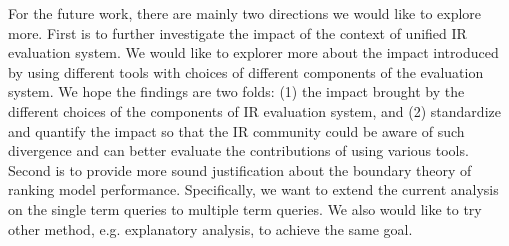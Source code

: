 For the future work, there are mainly two directions we would like to explore more. 
First is to further investigate the impact of the context of unified 
IR evaluation system. We would like to explorer more about the impact 
introduced by using different tools with choices of different components 
of the evaluation system. We hope the findings are two folds: 
(1) the impact brought by the different choices of the components of IR 
evaluation system, and (2) standardize and quantify the impact so that the IR 
community could be aware of such divergence and can better evaluate the 
contributions of using various tools. 
Second is to provide more sound justification about the boundary theory 
of ranking model performance. Specifically, we want to extend the current 
analysis on the single term queries to multiple term queries. We also would 
like to try other method, e.g. explanatory analysis, to achieve the same goal.















